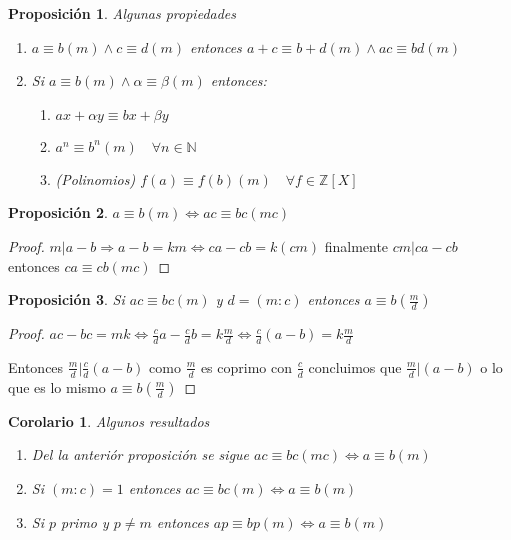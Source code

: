 \documentclass{article}
\theoremstyle{break}
\newtheorem{corollary}{Corolario}[theorem]
\newtheorem{proposition}{Proposición}
\def \N{\mathbb{N}}
\def \Z{\mathbb{Z}}
\begin{document}
        \begin{proposition}
            Algunas propiedades
            \begin{enumerate}
                \item $a\equiv b (m)\land c \equiv d(m)$ entonces $a+c \equiv b+d (m) \land ac \equiv bd (m)$
                \item Si $a\equiv b(m) \land \alpha \equiv \beta (m)$ entonces:
                    \begin{enumerate}
                        \item $ax + \alpha y \equiv bx + \beta y $
                        \item $a^n \equiv b^n (m)\quad \forall n\in\N$
                        \item (Polinomios) $f(a) \equiv f(b)(m)\quad\forall f\in\Z[X]$
                    \end{enumerate}
            \end{enumerate}
        \end{proposition}

        \begin{proposition}
            $a \equiv b(m) \iff ac\equiv bc (mc)$
        \end{proposition}
        \begin{proof}
            $m|a-b \Rightarrow a-b=km \iff ca -cb = k(cm)$ finalmente $cm|ca-cb$ entonces $ca\equiv cb (mc)$
        \end{proof}

        \begin{proposition}
            Si $ac \equiv bc (m)$ y $d=(m:c)$ entonces $a\equiv b(\frac{m}{d})$
        \end{proposition}
        \begin{proof}
            $ac-bc=mk \iff \frac{c}{d}a - \frac{c}{d}b = k\frac{m}{d}\iff \frac{c}{d}(a-b) = k\frac{m}{d} $

            Entonces $\frac{m}{d} | \frac{c}{d}(a-b)$ como $\frac{m}{d}$ es coprimo con $\frac{c}{d}$ concluimos que
            $\frac{m}{d} | (a-b)$ o lo que es lo mismo $a\equiv b (\frac{m}{d})$
        \end{proof}

        \begin{corollary}
            Algunos resultados
            \begin{enumerate}
                \item Del la anteriór proposición se sigue $ac\equiv bc (mc) \iff a\equiv b (m)$
                \item Si $(m:c)=1$ entonces $ac\equiv bc (m) \iff a\equiv b (m)$ 
                \item Si $p$ primo y $p\neq m$ entonces $ap\equiv bp (m) \iff a\equiv b(m)$
            \end{enumerate}
        \end{corollary}
\end{document}
